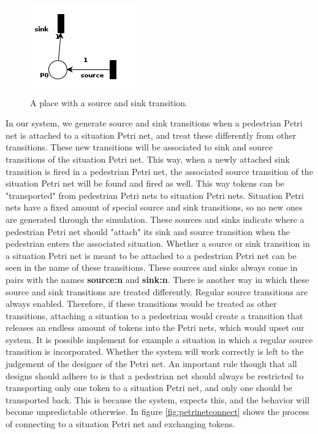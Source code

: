 \documentclass[11pt, a4paper]{book}
\begin{document}
\begin{figure}
\begin{center}
\includegraphics[width=.3\textwidth]{petrinet_pictures/sourceandsink.png}
\end{center}
\caption{A place with a source and sink transition.}
\label{fig:sourceandsink}
\end{figure}
In our system, we generate source and sink transitions when a pedestrian Petri net is attached to a situation Petri net, and treat these differently from other transitions. These new transitions will be associated to sink and source transitions of the situation Petri net. This way, when a newly attached sink transition is fired in a pedestrian Petri net, the associated source transition of the situation Petri net will be found and fired as well. This way tokens can be "transported" from pedestrian Petri nets to situation Petri nets. Situation Petri nets have a fixed amount of special source and sink transitions, so no new ones are generated through the simulation. These sources and sinks indicate where a pedestrian Petri net should "attach" its sink and source transition when the pedestrian enters the associated situation. Whether a source or sink transition in a situation Petri net is meant to be attached to a pedestrian Petri net can be seen in the name of these transitions. These sources and sinks always come in pairs with the names \textbf{source:n} and \textbf{sink:n}.
There is another way in which these source and sink transitions are treated differently. Regular source transitions are always enabled. Therefore, if these transitions would be treated as other transitions, attaching a situation to a pedestrian would create a transition that releases an endless amount of tokens into the Petri nets, which would upset our system. It is possible implement for example a situation in which a regular source transition is incorporated. Whether the system will work correctly is left to the judgement of the designer of the Petri net. An important rule though that all designs should adhere to is that a pedestrian net should always be restricted to transporting only one token to a situation Petri net, and only one should be transported back. This is because the system, expects this, and the behavior will become unpredictable otherwise. In figure \ref{fig:petrinetconnect} shows the process of connecting to a situation Petri net and exchanging tokens.
\end{document}
